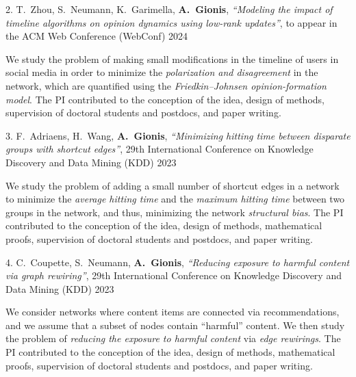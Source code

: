 \documentclass[a4paper,11pt]{article}
\begin{document}
\textbibspace

\item[{2.}]
{T.\ Zhou, S.\ Neumann, K.\ Garimella, \textbf{A.\ Gionis}},
{\em ``Modeling the impact of timeline algorithms on opinion dynamics using low-rank updates''},
to appear in the ACM Web Conference (WebConf) 2024
%
\item[]
We study the problem of making small modifications in the timeline of users in social media
in order to minimize the \emph{polarization and disagreement} in the network, 
which are quantified using the \emph{Friedkin--Johnsen opinion-formation model}.
The PI contributed to the conception of the idea, 
design of methods, supervision of doctoral students and postdocs, and paper writing.

\textbibspace

\item[{3.}]
{F.\ Adriaens, H.\ Wang, \textbf{A.\ Gionis}},
{\em ``Minimizing hitting time between disparate groups with shortcut edges''},
29th International Conference on Knowledge Discovery and Data Mining (KDD) 2023
%
\item[]
We study the problem of adding a small number of shortcut edges in a network 
to minimize the \emph{average hitting time} and the \emph{maximum hitting time} between two groups
in the network, and thus, minimizing the network \emph{structural bias}. 
The PI contributed to the conception of the idea, 
design of methods, mathematical proofs, supervision of doctoral students and postdocs, and paper writing.

\textbibspace

\item[{4.}]
{C.\ Coupette, S.\ Neumann, \textbf{A.\ Gionis}},
{\em ``Reducing exposure to harmful content via graph rewiring''},
29th International Conference on Knowledge Discovery and Data Mining (KDD) 2023
%
\item[]
We consider networks where content items are connected via recommendations, 
and we assume that a subset of nodes contain ``harmful'' content.
We then study the problem of \emph{reducing the exposure to harmful content} via \emph{edge rewirings}. 
The PI contributed to the conception of the idea, 
design of methods, mathematical proofs, supervision of doctoral students and postdocs, and paper writing.
\end{document}
